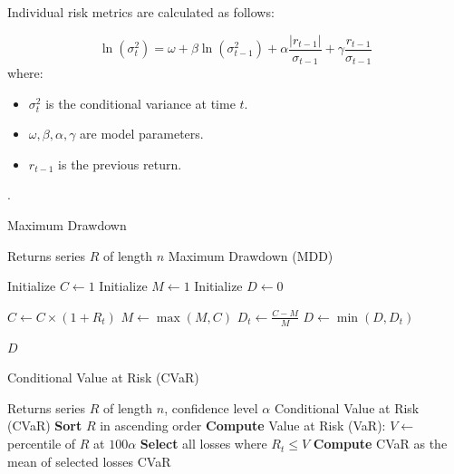 \documentclass[3p,times,procedia]{elsarticle}
\begin{document}
Individual risk metrics are calculated as follows:

 \cite{Nelson1991}
\begin{equation}
\ln(\sigma_t^2) = \omega + \beta \ln(\sigma_{t-1}^2) + \alpha \frac{|r_{t-1}|}{\sigma_{t-1}} + \gamma \frac{r_{t-1}}{\sigma_{t-1}}
\end{equation}
\vspace{-0.1cm}
where:
\begin{itemize}
    \item $\sigma_t^2$ is the conditional variance at time $t$.
    \item $\omega, \beta, \alpha, \gamma$ are model parameters.
    \item $r_{t-1}$ is the previous return.
\end{itemize}

 \cite{Jorion2001}.

\vspace{-0.3cm}
\begin{algorithm}[H]
\caption{Maximum Drawdown}
\label{alg:max_drawdown}
\begin{algorithmic}[1]
    \Require Returns series \( R \) of length \( n \)
    \Ensure Maximum Drawdown (MDD)
    
    \State Initialize \( C \gets 1 \) 
    \State Initialize \( M \gets 1 \) 
    \State Initialize \( D \gets 0 \) 

        \State \( C \gets C \times (1 + R_t) \) 
        \State \( M \gets \max(M, C) \) 
        \State \( D_t \gets \frac{C - M}{M} \) 
        \State \( D \gets \min(D, D_t) \) 
    \EndFor

    \State \Return \( D \)
\end{algorithmic}
\end{algorithm}

\vspace{-0.3cm}
\begin{algorithm}[H]
\caption{Conditional Value at Risk (CVaR)}
\label{alg:cvar}
\begin{algorithmic}[1]
    \Require Returns series $R$ of length $n$, confidence level $\alpha$
    \Ensure Conditional Value at Risk (CVaR)
    \State \textbf{Sort} $R$ in ascending order 
    \State \textbf{Compute} Value at Risk (VaR): $V \gets$ percentile of $R$ at $100\alpha$
    \State \textbf{Select} all losses where $R_t \leq V$
    \State \textbf{Compute} CVaR as the mean of selected losses
    \State \Return CVaR
\end{algorithmic}
\end{algorithm}
\end{document}
